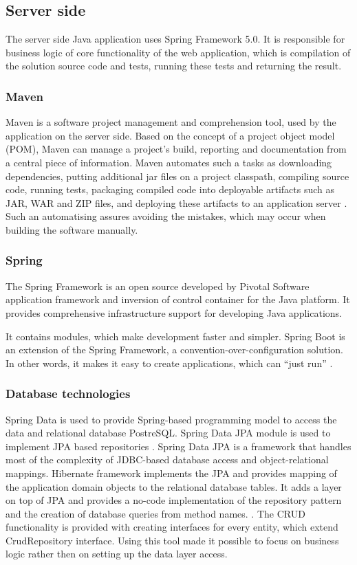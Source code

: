 \subsection{Server side}
The server side Java application uses Spring Framework 5.0. It is responsible for business logic of core functionality of the web application, which is compilation of the solution source code and tests, running these tests and returning the result.

\subsubsection{Maven}
Maven is a software project management and comprehension tool, used by the application on the server side. Based on the concept of a project object model (POM), Maven can manage a project's build, reporting and documentation from a central piece of information. Maven automates such a tasks as downloading dependencies, putting additional jar files on a project classpath, compiling source code, running tests, packaging compiled code into deployable artifacts such as JAR, WAR and ZIP files, and deploying these artifacts to an application server \cite{maven}. Such an automatising assures avoiding the mistakes, which may occur when building the software manually.

\subsubsection{Spring}
The Spring Framework is an open source developed by Pivotal Software application framework and inversion of control container for the Java platform. It provides comprehensive infrastructure support for developing Java applications. 

It contains modules, which make development faster and simpler. Spring Boot is an extension of the Spring Framework, a convention-over-configuration solution. In other words, it makes it easy to create applications, which can ``just run'' \cite{spring_boot}.

\subsubsection{Database technologies}
Spring Data is used to provide Spring-based programming model to access the data and relational database PostreSQL. Spring Data JPA module is used to implement JPA based repositories \cite{spring_data}. Spring Data JPA is a framework that handles most of the complexity of JDBC-based database access and object-relational mappings. Hibernate framework implements the JPA and provides mapping of the application domain objects to the relational database tables. It adds a layer on top of JPA and provides a no-code implementation of the repository pattern and the creation of database queries from method names. \cite[Part VI, Persistence]{jpa}. The CRUD functionality is provided with creating interfaces for every entity, which extend CrudRepository interface. Using this tool made it possible to focus on business logic rather then on setting up the data layer access.

